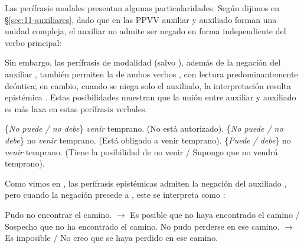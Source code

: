 Las perífrasis modales presentan algunas particularidades. Según dijimos en
§\ref{sec:11-auxiliares}, dado que en las PPVV auxiliar y auxiliado forman una
unidad compleja, el auxiliar no admite ser negado en forma independiente del
verbo principal:

\begin{exe}
\end{exe}

Sin embargo, las perífrasis de modalidad (salvo ), además de la
negación del auxiliar , también permiten la de ambos
verbos , con lectura predominantemente deóntica; en
cambio, cuando se niega solo el auxiliado, la interpretación resulta epistémica
. Estas posibilidades muestran que la unión entre auxiliar
y auxiliado es más laxa en estas perífrasis verbales.

\begin{exe}
  \ex
    \begin{xlist}
      \ex\label{ex:11-negmod-a} \{\textit{No puede / no debe}\} \textit{venir}
          temprano. (No está autorizado).
      \ex\label{ex:11-negmod-b} \{\textit{No puede / no debe}\} no \textit{venir}
          temprano. (Está obligado a venir temprano).
      \ex\label{ex:11-negmod-c} \{\textit{Puede / debe}\} no \textit{venir}
          temprano. (Tiene la posibilidad de no venir / Supongo que no vendrá
          temprano).
    \end{xlist}
\end{exe}

Como vimos en , las perífrasis epistémicas admiten la
negación del auxiliado , pero cuando la negación precede a
, este se interpreta como 
:

\begin{exe}
  \ex\label{ex:11-camino1} Pudo no encontrar el camino. $\rightarrow$ Es posible
      que no haya encontrado el camino / Sospecho que no ha encontrado el camino.
  \ex\label{ex:11-camino2} No pudo perderse en ese camino. $\rightarrow$ Es
      imposible / No creo que se haya perdido en ese camino.
\end{exe}


